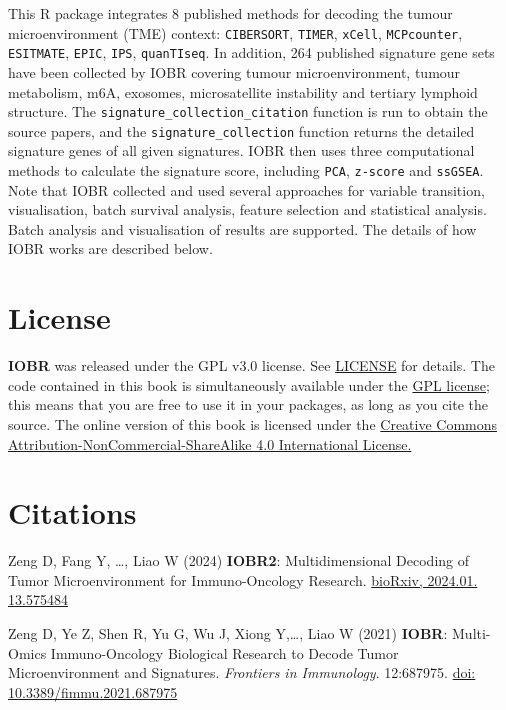 \documentclass[
  12pt,
]{book}
\begin{document}
This R package integrates 8 published methods for decoding the tumour microenvironment (TME) context: \texttt{CIBERSORT}, \texttt{TIMER}, \texttt{xCell}, \texttt{MCPcounter}, \texttt{ESITMATE}, \texttt{EPIC}, \texttt{IPS}, \texttt{quanTIseq}. In addition, 264 published signature gene sets have been collected by IOBR covering tumour microenvironment, tumour metabolism, m6A, exosomes, microsatellite instability and tertiary lymphoid structure. The \texttt{signature\_collection\_citation} function is run to obtain the source papers, and the \texttt{signature\_collection} function returns the detailed signature genes of all given signatures. IOBR then uses three computational methods to calculate the signature score, including \texttt{PCA}, \texttt{z-score} and \texttt{ssGSEA}. Note that IOBR collected and used several approaches for variable transition, visualisation, batch survival analysis, feature selection and statistical analysis. Batch analysis and visualisation of results are supported. The details of how IOBR works are described below.

\hypertarget{license}{%
\section{License}\label{license}}

\textbf{IOBR} was released under the GPL v3.0 license. See \href{https://github.com/IOBR/IOBR/blob/master/LICENSE}{LICENSE} for details. The code contained in this book is simultaneously available under the \href{https://www.gnu.org/licenses/why-not-lgpl.html}{GPL license}; this means that you are free to use it in your packages, as long as you cite the source. The online version of this book is licensed under the \href{https://creativecommons.org/licenses/by-nc-sa/4.0/}{Creative Commons Attribution-NonCommercial-ShareAlike 4.0 International License.}

\hypertarget{citations}{%
\section{Citations}\label{citations}}

Zeng D, Fang Y, \ldots, Liao W (2024) \textbf{IOBR2}: Multidimensional Decoding of Tumor Microenvironment for Immuno-Oncology Research. \href{https://www.biorxiv.org/content/10.1101/2024.01.13.575484v2.full.pdf}{bioRxiv, 2024.01. 13.575484}

Zeng D, Ye Z, Shen R, Yu G, Wu J, Xiong Y,\ldots, Liao W (2021) \textbf{IOBR}: Multi-Omics Immuno-Oncology Biological Research to Decode Tumor Microenvironment and Signatures. \emph{Frontiers in Immunology}. 12:687975. \href{https://www.frontiersin.org/articles/10.3389/fimmu.2021.687975/full}{doi: 10.3389/fimmu.2021.687975}
\end{document}
